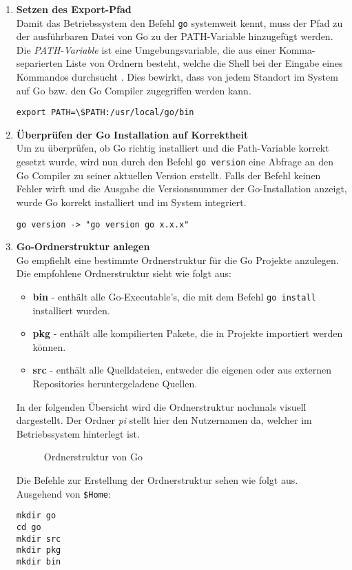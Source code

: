 \begin{enumerate}
\item \textbf{Setzen des Export-Pfad} \\
Damit das Betriebssystem den Befehl \verb|go| systemweit kennt, muss der Pfad zu der
ausführbaren Datei von Go zu der PATH-Variable hinzugefügt werden. Die
\textit{PATH-Variable} ist eine Umgebungsvariable, die aus einer
Komma-separierten Liste von Ordnern besteht, welche die Shell bei der Eingabe
eines Kommandos durchsucht \autocite{quigley_2000}. Dies bewirkt, dass von
jedem Standort im System auf Go bzw. den Go Compiler zugegriffen werden kann.
\begin{lstlisting}[caption={Setzen der Go-Path Variable}]
export PATH=\$PATH:/usr/local/go/bin
\end{lstlisting}

\item \textbf{Überprüfen der Go Installation auf Korrektheit} \\
Um zu überprüfen, ob Go richtig installiert und die Path-Variable
korrekt gesetzt wurde, wird nun durch den Befehl \verb|go version|
eine Abfrage an den Go Compiler zu seiner aktuellen Version erstellt. Falls der
Befehl keinen Fehler wirft und die Ausgabe die Versionsnummer der
Go-Installation anzeigt, wurde Go korrekt installiert und im System
integriert.
\begin{lstlisting}[caption={Go Version anzeigen}]
go version -> "go version go x.x.x"
\end{lstlisting}

\item \textbf{Go-Ordnerstruktur anlegen} \\
Go empfiehlt eine bestimmte Ordnerstruktur für die Go Projekte anzulegen.
Die empfohlene Ordnerstruktur sieht wie folgt aus:
\begin{itemize}
\item \textbf{bin} - enthält alle Go-Executable's, die mit dem Befehl \verb|go install| installiert wurden.
\item \textbf{pkg} - enthält alle kompilierten Pakete, die in Projekte importiert werden können. 
\item \textbf{src} - enthält alle Quelldateien, entweder die eigenen oder aus externen Repositories heruntergeladene Quellen.
\end{itemize}
In der folgenden Übersicht wird die Ordnerstruktur nochmals visuell
dargestellt. Der Ordner \textit{pi} stellt hier den Nutzernamen da, welcher im
Betriebssystem hinterlegt ist. \newline
\begin{minipage}[t]{\textwidth}
\begin{figure}[H]
\caption{Ordnerstruktur von Go} 
\end{figure}
Die Befehle zur Erstellung der Ordnerstruktur sehen wie folgt aus. \\
Ausgehend von \verb|$Home|:
\begin{lstlisting}[caption={Erstellung der Go Ordnerstruktur},label={lst:go_folder_structure}]
mkdir go
cd go
mkdir src
mkdir pkg
mkdir bin
\end{lstlisting}
\end{minipage}



\end{enumerate}
